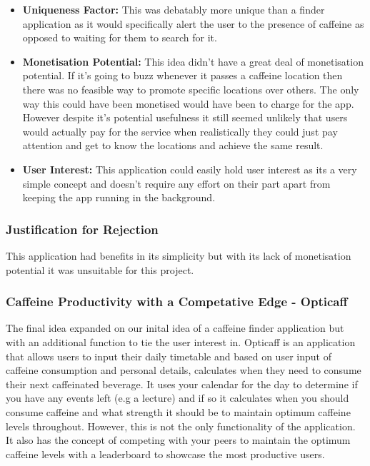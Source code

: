 \begin{itemize}
	\item{\textbf{Uniqueness Factor:} This was debatably more unique than a finder application as it would specifically alert the user to the presence of caffeine as opposed to waiting for them to search for it.}
	\item{\textbf{Monetisation Potential:} This idea didn't have a great deal of monetisation potential. If it's going to buzz whenever it passes a caffeine location then there was no feasible way to promote specific locations over others. The only way this could have been monetised would have been to charge for the app. However despite it's potential usefulness it still seemed unlikely that users would actually pay for the service when realistically they could just pay attention and get to know the locations and achieve the same result.}
	\item{\textbf{User Interest:} This application could easily hold user interest as its a very simple concept and doesn't require any effort on their part apart from keeping the app running in the background.}
\end{itemize}

\subsubsection{Justification for Rejection}
This application had benefits in its simplicity but with its lack of monetisation potential it was unsuitable for this project. 

\subsubsection{Caffeine Productivity with a Competative Edge - Opticaff}
The final idea expanded on our inital idea of a caffeine finder application but with an additional function to tie the user interest in. Opticaff is an application that allows users to input their daily timetable and based on user input of caffeine consumption and personal details, calculates when they need to consume their next caffeinated beverage. It uses your calendar for the day to determine if you have any events left (e.g a lecture) and if so it calculates when you should consume caffeine and what strength it should be to maintain optimum caffeine levels throughout. However, this is not the only functionality of the application. It also has the concept of competing with your peers to maintain the optimum caffeine levels with a leaderboard to showcase the most productive users. 

